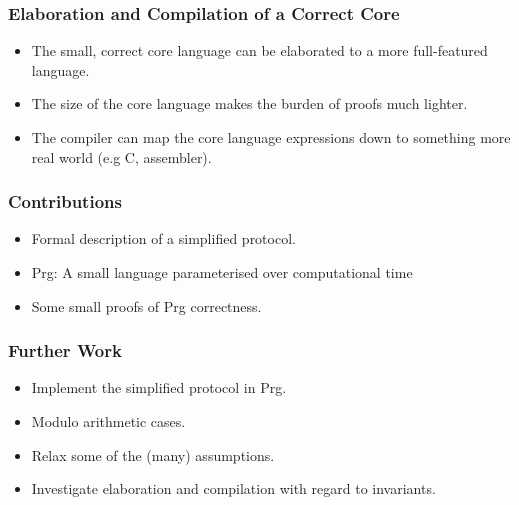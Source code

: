 \documentclass{beamer}
\begin{document}
\begin{frame}[fragile]
  \frametitle{Elaboration and Compilation of a Correct Core}
  \begin{minipage}[c]{5cm}
  \begin{center}
  \end{center}
  \end{minipage}
  \begin{minipage}[c]{\textwidth-6cm}
  \begin{itemize}
    \item The small, correct core language can be elaborated to
          a more full-featured language.
    \item The size of the core language makes the burden of proofs
          much lighter.
    \item The compiler can map the core language expressions down
          to something more real world (e.g C, assembler).
  \end{itemize}
  \end{minipage}
\end{frame}

\begin{frame}[fragile]
  \frametitle{Contributions}
  \begin{itemize}
    \item Formal description of a simplified protocol.
    \item Prg: A small language parameterised over computational 
          time
    \item Some small proofs of Prg correctness.
  \end{itemize}
\end{frame}

\begin{frame}[fragile]
  \frametitle{Further Work}
  \begin{itemize}
    \item Implement the simplified protocol in Prg.
    \item Modulo arithmetic cases.
    \item Relax some of the (many) assumptions.
    \item Investigate elaboration and compilation with regard to 
          invariants.
  \end{itemize}
\end{frame}
\end{document}
